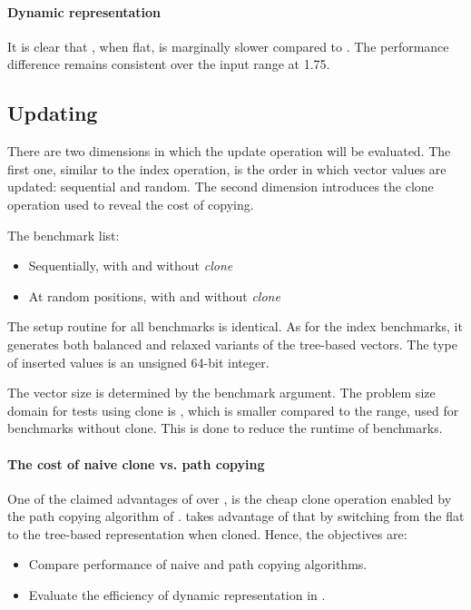 \paragraph{Dynamic representation}
It is clear that \pvec{}, when flat, is marginally slower compared to \stdvec{}. The performance difference remains consistent over the input range at 1.75.

\subsection{Updating}

There are two dimensions in which the update operation will be evaluated. The first one, similar to the index operation, is the order in which vector values are updated: sequential and random. The second dimension introduces the clone operation used to reveal the cost of copying.

The benchmark list:
\begin{itemize}
    \item Sequentially, with and without \emph{clone}
    \item At random positions, with and without \emph{clone}
\end{itemize}

The setup routine for all benchmarks is identical. As for the index benchmarks, it generates both balanced and relaxed variants of the tree-based vectors. The type of inserted values is an unsigned 64-bit integer.

The vector size is determined by the benchmark argument. The problem size domain for tests using clone is \range{[20, \kilo{20}]}, which is smaller compared to the \range{[20, \kilo{100}]} range, used for benchmarks without clone. This is done to reduce the runtime of benchmarks.

\paragraph{The cost of naive clone vs. path copying}
One of the claimed advantages of \rbvec{} over \stdvec{}, is the cheap clone operation enabled by the path copying algorithm of \rbtree{}. \pvec{} takes advantage of that by switching from the flat to the tree-based representation when cloned. Hence, the objectives are:
\begin{itemize}
    \item Compare performance of naive and path copying algorithms.
    \item Evaluate the efficiency of dynamic representation in \pvec{}.
\end{itemize}

